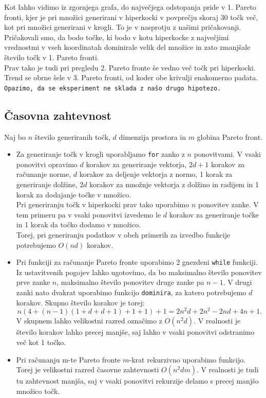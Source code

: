 \documentclass{article}
\begin{document}
Kot lahko vidimo iz zgornjega grafa, do največjega odstopanja pride v 1. Pareto fronti, kjer je pri množici generirani v hiperkocki v povprečju skoraj 30 točk več, kot pri množici generirani v krogli. To je v nasprotju z našimi pričakovanji. Pričakovali smo, da bodo točke, ki bodo v kotu hiperkocke z največjimi vrednostmi v vseh koordinatah dominirale velik del množice in zato zmanjšale število točk v 1. Pareto fronti. \\
Prav tako je tudi pri pregledu 2. Pareto fronte še vedno več točk pri hiperkocki. Trend se obrne šele v 3. Pareto fronti, od koder obe krivulji enakomerno padata.
\texttt{Opazimo, da se eksperiment ne sklada z našo drugo hipotezo.}

\subsection{Časovna zahtevnost}
Naj bo $n$ število generiranih točk, $d$ dimenzija prostora in $m$ globina Pareto front. 
\begin{itemize}
    \item Za generiranje točk v krogli uporabljamo \texttt{for} zanko z $n$ ponovitvami. V vsaki ponovitvi opravimo $d$ korakov za generiranje vektorja, $2d + 1$ korakov za računanje norme, $d$ korakov za deljenje vektorja z normo, 1 korak za generiranje dolžine, $2d$ korakov za množnje vektorja z dolžino in radijem in  1 korak za dodajanje točke v množico. \\
    Pri generiranju točk v hiperkocki prav tako uporabimo $n$ ponovitev zanke. V tem primeru pa v vsaki ponovitvi izvedemo le $d$ korakov za generiranje točke in 1 korak da točko dodamo v množico. \\
    Torej, pri generiranju podatkov v obeh primerih za izvedbo funkcije potrebujemo $O(nd)$ korakov. 
    \item Pri funkciji za računanje Pareto fronte uporabimo 2 gnezdeni \texttt{while} funkciji. Iz ustavitvenih pogojev lahko ugotovimo, da bo maksimalno število ponovitev prve zanke $n$, maksimalno število ponovitev druge zanke pa $n-1$. V drugi zanki nato dvakrat uporabimo funkcijo \texttt{dominira}, za katero potrebujemo $d$ korakov. Skupno število korakov je torej:
    $$
        n (4 + (n-1) (1 + d + d + 1) + 1 + 1) + 1 = 
        2n^2d + 2n^2 - 2nd + 4n + 1.
    $$
    V skupnem lahko velikostni razred označimo z $O(n^2d)$. V realnosti je število korakov lahko precej manjše, saj lahko v vsaki ponovitvi odstranimo več kot 1 točko.
    \item Pri računanju m-te Pareto fronte $m$-krat rekurzivno uporabimo funkcijo. Torej je velikostni razred časovne zahtevnosti $O(n^2dm)$. V realnosti je tudi tu zahtevnost manjša, saj v vsaki ponovitvi rekurzije delamo s precej manjšo množico točk.
\end{itemize}
 
\end{document}
